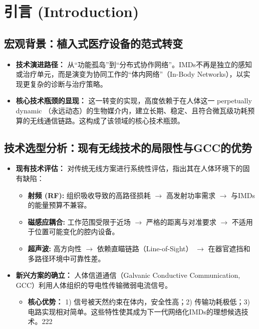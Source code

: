 \documentclass[UTF8,zihao=-4]{ctexart}
\begin{document}
\section{引言 (Introduction)}
\subsection{宏观背景：植入式医疗设备的范式转变}
\begin{itemize}
    \item \textbf{技术演进路径：} 从“功能孤岛”到“分布式协作网络”。IMDs不再是独立的感知或治疗单元，而是演变为协同工作的“体内网络”（In-Body Networks），以实现更复杂的诊断与治疗策略。
    \item \textbf{核心技术瓶颈的显现：} 这一转变的实现，高度依赖于在人体这一 perpetually dynamic （永远动态）的生物媒介内，建立长期、稳定、且符合微瓦级功耗预算的无线通信链路。这构成了该领域的核心技术瓶颈。
\end{itemize}

\subsection{技术选型分析：现有无线技术的局限性与GCC的优势}
\begin{itemize}
    \item \textbf{现有技术评估：} 对传统无线方案进行系统性评估，指出其在人体环境下的固有缺陷：
        \begin{itemize}
            \item \textbf{射频 (RF):} 组织吸收导致的高路径损耗 $\rightarrow$ 高发射功率需求 $\rightarrow$ 与IMDs的能量预算不兼容。
            \item \textbf{磁感应耦合:} 工作范围受限于近场 $\rightarrow$ 严格的距离与对准要求 $\rightarrow$ 不适用于位置可能变化的腔内设备。
            \item \textbf{超声波:} 高方向性 $\rightarrow$ 依赖直瞄链路（Line-of-Sight） $\rightarrow$ 在器官遮挡和多路径环境中可靠性差。
        \end{itemize}
    \item \textbf{新兴方案的确立：} 人体信道通信（Galvanic Conductive Communication, GCC）利用人体组织的导电性传输微弱电流信号。
        \begin{itemize}
            \item \textbf{核心优势：} 1) 信号被天然约束在体内，安全性高；2) 传输功耗极低；3) 电路实现相对简单。这些特性使其成为下一代网络化IMDs的理想候选技术。222
        \end{itemize}
\end{itemize}
\end{document}
